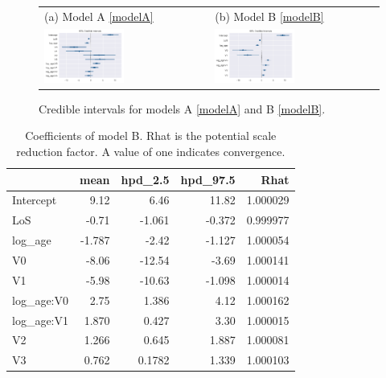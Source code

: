 \begin{figure}
  \centering
    \begin{tabular}{ll}
(a) Model A \eqref{modelA} & (b) Model B \eqref{modelB}\\
\includegraphics[width=0.5\textwidth]{images/DS19fm0_c0__forestplot_model_A.pdf}&
\includegraphics[width=0.5\textwidth]{images/DS19fk1_c0__forestplot_model_B}\\
\end{tabular}
    \caption{Credible intervals for models A \eqref{modelA} and B \eqref{modelB}.}
    \label{fig:forest_plots}
\end{figure}

\begin{table}
\caption{\label{tab:coeff} Coefficients of model B. Rhat is the
  potential scale reduction factor. A value of one indicates
  convergence.}
\centering
\begin{tabular}{lrrrr}
\hline
\hline
{} &      mean &    hpd\_2.5 &   hpd\_97.5 &      Rhat \\
\hline
Intercept  &  9.12 &   6.46 &  11.82 &  1.000029 \\
LoS        & -0.71 &  -1.061 &  -0.372 &  0.999977 \\
log\_age    & -1.787 &  -2.42 &  -1.127 &  1.000054 \\
V0         & -8.06 & -12.54 &  -3.69 &  1.000141 \\
V1         & -5.98 & -10.63 &  -1.098 &  1.000014 \\
log\_age:V0 &  2.75 &   1.386 &   4.12 &  1.000162 \\
log\_age:V1 &  1.870 &   0.427 &   3.30 &  1.000015 \\
V2         &  1.266 &   0.645 &   1.887 &  1.000081 \\
V3         &  0.762 &   0.1782 &   1.339 &  1.000103 \\
\hline
\hline
\end{tabular}
\end{table}


